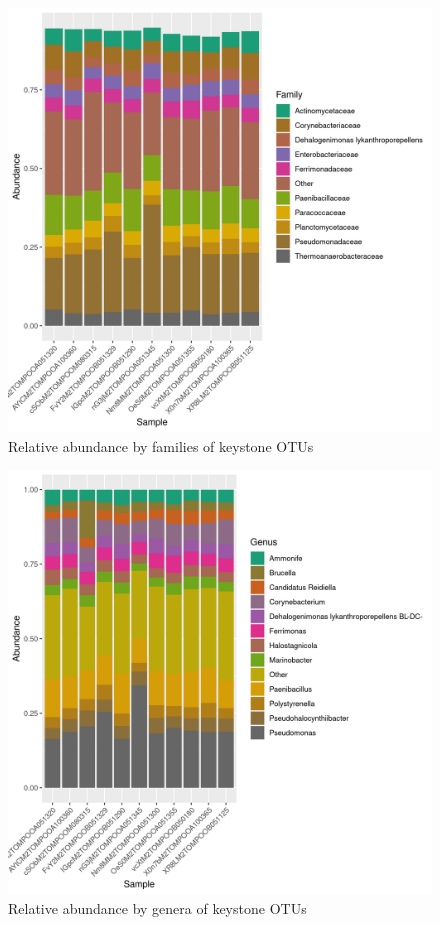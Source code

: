 \begin{figure}
\centering
\includegraphics[scale = 0.8]{tomate_aleatorio1_7.csv_relative_abundance_Family.png}
\caption{Relative abundance by families of keystone OTUs }
\label{fig:tomate_aleatorio1_7.csv_family}
\end{figure}
\begin{figure}
\centering
\includegraphics[scale = 0.8]{tomate_aleatorio1_7.csv_relative_abundance_Genus.png}
\caption{Relative abundance by genera of keystone OTUs }
\label{fig:tomate_aleatorio1_7.csv_genus}
\end{figure}
